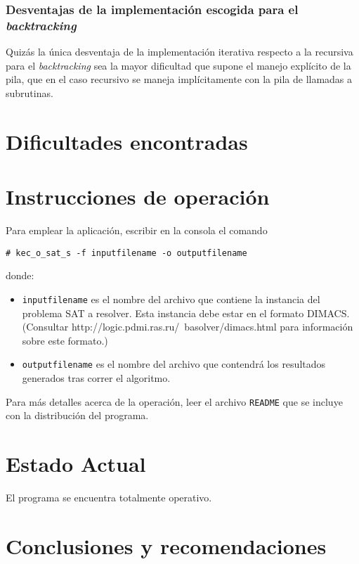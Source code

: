 \documentclass[12pt,lettersize]{article}
\begin{document}
\subsubsection{Desventajas de la implementación escogida para el \emph{backtracking}}
Quizás la única desventaja de la implementación iterativa respecto a la
recursiva para el \emph{backtracking} sea la mayor dificultad que supone el
manejo explícito de la pila, que en el caso recursivo se maneja implícitamente
con la pila de llamadas a subrutinas.



\section{Dificultades encontradas}

\section{Instrucciones de operación}
Para emplear la aplicación, escribir en la consola el comando
\begin{lstlisting}[style=consola]
# kec_o_sat_s -f inputfilename -o outputfilename 
\end{lstlisting}
\noindent donde:
\vspace{-2.5mm}
\begin{itemize}
\item {\tt inputfilename} es el nombre del archivo que contiene la instancia del
  problema SAT a resolver. Esta instancia debe estar en el formato DIMACS.
(Consultar http://logic.pdmi.ras.ru/~basolver/dimacs.html para información sobre
este formato.)
\item {\tt outputfilename} es el nombre del archivo que contendrá los resultados
  generados tras correr el algoritmo.
\end{itemize}

Para más detalles acerca de la operación, leer el archivo {\tt README} que se
incluye con la distribución del programa.
\section{Estado Actual}
El programa se encuentra totalmente operativo.

\section{Conclusiones y recomendaciones}
\end{document}
